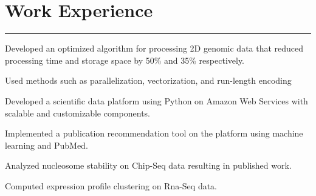 \documentclass[letterpaper]{deedy-resume} %
\newcommand{\colorrule}[1]{%
\begingroup\color{#1}\hrule\endgroup%
}%
\begin{document}
\section{Work Experience}
\normalfont
\colorrule{black}
\vspace{2 mm}
\hfill
{}
\hfill
{}
\vspace{1 mm}
\begin{tightitemize}
	\item Developed an optimized algorithm for processing 2D genomic data that reduced processing time and storage space by 50\% and 35\% respectively.
	\item Used methods such as parallelization, vectorization, and run-length encoding 
\end{tightitemize}
\vspace{2 mm}
\hfill
{}
\hfill
{}
\vspace{1 mm}
\begin{tightitemize}
	\item Developed a scientific data platform using Python on Amazon Web Services with scalable and customizable components.
	\item Implemented a publication recommendation tool on the platform using machine learning and PubMed.	
\end{tightitemize}
\vspace{2 mm}
\hfill
{}
\hfill
{}
\vspace{1 mm}
\begin{tightitemize}
	\item Analyzed nucleosome stability on Chip-Seq data resulting in published work. 
	\item Computed expression profile clustering on Rna-Seq data. 	
\end{tightitemize}
\end{document}
